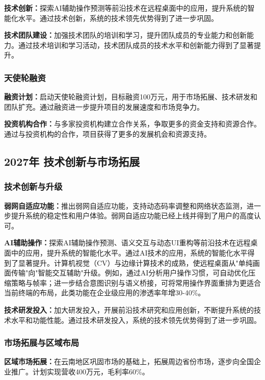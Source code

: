 \documentclass[12pt,a4paper]{article}
\begin{document}
\textbf{技术创新：}探索AI辅助操作预测等前沿技术在远程桌面中的应用，提升系统的智能化水平。通过技术创新，系统的技术领先优势得到了进一步巩固。

\textbf{技术团队建设：}加强技术团队的培训和学习，提升团队成员的专业能力和创新能力。通过技术培训和学习活动，技术团队成员的技术水平和创新能力得到了显著提升。

\subsubsection{天使轮融资}
\textbf{融资计划：}启动天使轮融资计划，目标融资100万元，用于市场拓展、技术研发和团队扩充。通过融资进一步提升项目的发展速度和市场竞争力。

\textbf{投资机构合作：}与多家投资机构建立合作关系，争取更多的资金支持和资源合作。通过与投资机构的合作，项目获得了更多的发展机会和资源支持。

\subsection{2027年 技术创新与市场拓展}

\subsubsection{技术创新与升级}
\textbf{弱网自适应功能：}推出弱网自适应功能，支持动态码率调整和网络状态监测，进一步提升系统的稳定性和用户体验。弱网自适应功能已经上线并得到了用户的高度认可。

\textbf{AI辅助操作：}探索AI辅助操作预测、语义交互与动态UI重构等前沿技术在远程桌面中的应用，提升系统的智能化水平。通过AI技术的应用，系统的智能化水平得到了显著提升。计算机视觉（CV）与边缘计算技术的成熟，使远程桌面从"单纯画面传输"向"智能交互辅助"升级。例如，通过AI分析用户操作习惯，可自动优化压缩策略与帧率；进一步结合意图识别与语义桥接，可将常用操作界面重排为更适合当前终端的布局，此类功能在企业级应用的渗透率年增30-40\%。

\textbf{技术研发投入：}加大研发投入，开展前沿技术研究和应用创新，不断提升系统的技术水平和功能性能。通过技术研发投入，系统的技术领先优势得到了进一步巩固。

\subsubsection{市场拓展与区域布局}
\textbf{区域市场拓展：}在云南地区巩固市场的基础上，拓展周边省份市场，逐步向全国企业推广。计划实现营收400万元，毛利率60\%。
\end{document}
